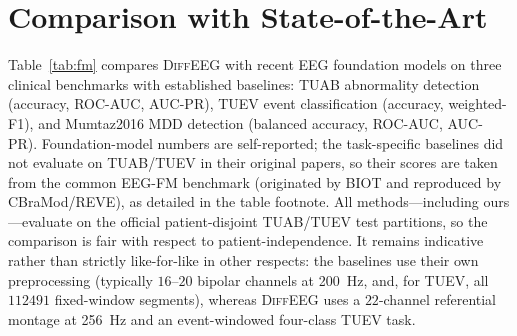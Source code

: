 \documentclass[journal]{IEEEtran}
\begin{document}
\section{Comparison with State-of-the-Art}
Table~\ref{tab:fm} compares \textsc{DiffEEG} with recent EEG foundation models
on three clinical benchmarks with established baselines: TUAB abnormality
detection (accuracy, ROC-AUC, AUC-PR), TUEV event classification (accuracy,
weighted-F1), and Mumtaz2016 MDD detection (balanced accuracy, ROC-AUC, AUC-PR).
Foundation-model numbers are self-reported; the task-specific
baselines did not evaluate on TUAB/TUEV in their original papers, so their
scores are taken from the common EEG-FM benchmark (originated by BIOT and
reproduced by CBraMod/REVE), as detailed in the table footnote.
All methods---including ours---evaluate on the official patient-disjoint
TUAB/TUEV test partitions, so the comparison is fair with respect to
patient-independence. It remains indicative rather than strictly like-for-like
in other respects: the baselines use their own preprocessing (typically
$16$--$20$ bipolar channels at \SI{200}{\hertz}, and, for TUEV, all
$\num{112491}$ fixed-window segments), whereas \textsc{DiffEEG} uses a
$22$-channel referential montage at \SI{256}{\hertz} and an event-windowed
four-class TUEV task.
\end{document}
